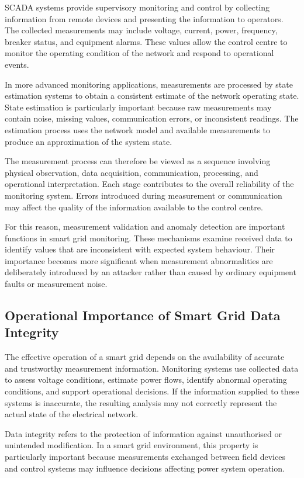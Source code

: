\documentclass[12pt,a4paper]{report}
\begin{document}
SCADA systems provide supervisory monitoring and control by collecting information from remote
devices and presenting the information to operators. The collected measurements may include
voltage, current, power, frequency, breaker status, and equipment alarms. These values allow
the control centre to monitor the operating condition of the network and respond to operational events.

In more advanced monitoring applications, measurements are processed by state estimation systems
to obtain a consistent estimate of the network operating state. State estimation is particularly
important because raw measurements may contain noise, missing values, communication errors, or
inconsistent readings. The estimation process uses the network model and available measurements
to produce an approximation of the system state.

The measurement process can therefore be viewed as a sequence involving physical observation,
data acquisition, communication, processing, and operational interpretation. Each stage
contributes to the overall reliability of the monitoring system. Errors introduced during
measurement or communication may affect the quality of the information available to the control centre.

For this reason, measurement validation and anomaly detection are important functions in smart
grid monitoring. These mechanisms examine received data to identify values that are inconsistent
with expected system behaviour. Their importance becomes more significant when measurement
abnormalities are deliberately introduced by an attacker rather than caused by ordinary equipment
faults or measurement noise.

\subsection{Operational Importance of Smart Grid Data Integrity}
The effective operation of a smart grid depends on the availability of accurate and trustworthy
measurement information. Monitoring systems use collected data to assess voltage conditions,
estimate power flows, identify abnormal operating conditions, and support operational decisions.
If the information supplied to these systems is inaccurate, the resulting analysis may not
correctly represent the actual state of the electrical network.

Data integrity refers to the protection of information against unauthorised or unintended
modification. In a smart grid environment, this property is particularly important because
measurements exchanged between field devices and control systems may influence decisions
affecting power system operation.
\end{document}
